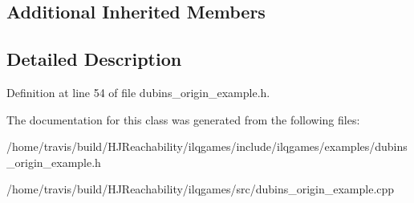 \subsection*{Additional Inherited Members}


\subsection{Detailed Description}


Definition at line 54 of file dubins\+\_\+origin\+\_\+example.\+h.



The documentation for this class was generated from the following files\+:\begin{DoxyCompactItemize}
\item 
/home/travis/build/\+H\+J\+Reachability/ilqgames/include/ilqgames/examples/dubins\+\_\+origin\+\_\+example.\+h\item 
/home/travis/build/\+H\+J\+Reachability/ilqgames/src/dubins\+\_\+origin\+\_\+example.\+cpp\end{DoxyCompactItemize}
